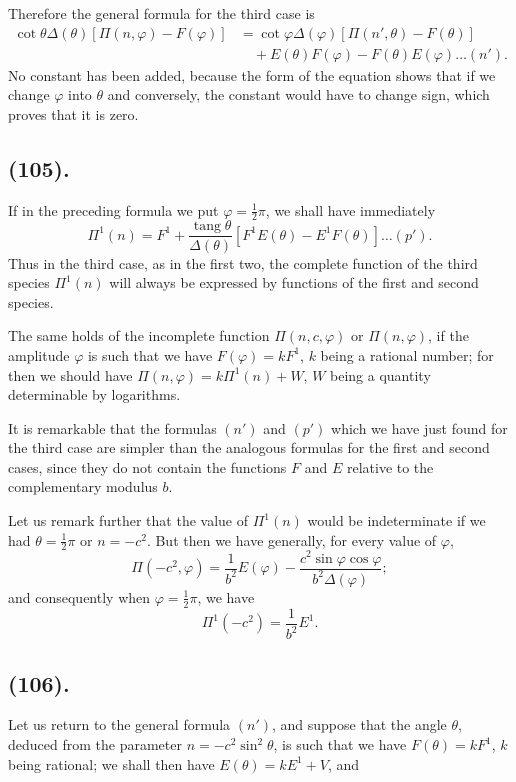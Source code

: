 \documentclass{article}
\begin{document}
Therefore the general formula for the third case is
\[ \begin{aligned} \cot\theta\Delta(\theta)[\Pi(n,\varphi)-F(\varphi)]&=\cot\varphi\Delta(\varphi)[\Pi(n',\theta)-F(\theta)]\\ &\quad+E(\theta)F(\varphi)-F(\theta)E(\varphi)\ldots(n'). \end{aligned} \]
No constant has been added, because the form of the equation shows that if we change $\varphi$ into $\theta$ and conversely, the constant would have to change sign, which proves that it is zero.

\subsection*{(105).}

If in the preceding formula we put $\varphi=\frac{1}{2}\pi$, we shall have immediately
\[ \Pi^{1}(n)=F^{1}+\frac{\operatorname{tang}\theta}{\Delta(\theta)}[F^{1}E(\theta)-E^{1}F(\theta)]\ldots(p'). \]
Thus in the third case, as in the first two, the complete function of the third species $\Pi^{1}(n)$ will always be expressed by functions of the first and second species.

The same holds of the incomplete function $\Pi(n,c,\varphi)$ or $\Pi(n,\varphi)$, if the amplitude $\varphi$ is such that we have $F(\varphi)=kF^{1}$, $k$ being a rational number; for then we should have $\Pi(n,\varphi)=k\Pi^{1}(n)+W$, $W$ being a quantity determinable by logarithms.

It is remarkable that the formulas $(n')$ and $(p')$ which we have just found for the third case are simpler than the analogous formulas for the first and second cases, since they do not contain the functions $F$ and $E$ relative to the complementary modulus $b$.

Let us remark further that the value of $\Pi^{1}(n)$ would be indeterminate if we had $\theta=\frac{1}{2}\pi$ or $n=-c^{2}$. But then we have generally, for every value of $\varphi$,
\[ \Pi(-c^{2},\varphi)=\frac{1}{b^{2}}E(\varphi)-\frac{c^{2}\sin\varphi\cos\varphi}{b^{2}\Delta(\varphi)}; \]
and consequently when $\varphi=\frac{1}{2}\pi$, we have
\[ \Pi^{1}(-c^{2})=\frac{1}{b^{2}}E^{1}. \]

\subsection*{(106).}

Let us return to the general formula $(n')$, and suppose that the angle $\theta$, deduced from the parameter $n=-c^{2}\sin^{2}\theta$, is such that we have $F(\theta)=kF^{1}$, $k$ being rational; we shall then have $E(\theta)=kE^{1}+V$, and
\end{document}
